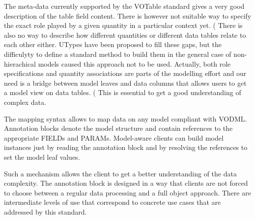 The meta-data currently supported by the  VOTable standard gives a very good description of the table field content. 
There is however not suitable way to specify the exact role played by a given quantity in a particular context yet.
(%
There is also no way to describe how different quantities or different data tables relate to each other either.
UTypes have been proposed to fill these gaps, but the difficulyty to define a standard method to build them in the general case of non-hierachical models caused this approach not to be used.
Actually, both role specifications and quantity associations are parts of the modelling effort and our need is a bridge between model leaves and data columns that allows users to get a model view on data tables. (%
This is essential to get a good  understanding of complex data.

The mapping syntax allows to map data on any model compliant with VODML. 
Annotation blocks denote the model structure and contain references to the appropriate
FIELDs and PARAMs. Model-aware clients can build model instances just by reading the annotation
block and by resolving the references to set the model leaf values. 

Such a mechanism allows the client to get a better understanding of the data complexity.
The annotation block is designed in a way that clients are not forced to choose between a regular data processing and a full object approach.
There are intermediate levels of use that correspond to concrete use cases that are addressed by this standard.



